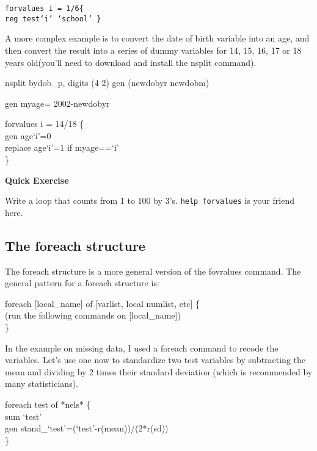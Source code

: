 \documentclass[10pt]{article}
\begin{document}
\texttt{forvalues i = 1/6\{\\
         reg test`i' `school'
        \} 
        }

A more complex example is to convert the date of birth variable into
an age, and then convert the result into a series of dummy variables for  14, 15, 16, 17 or 18
years old(you'll need to download and install the nsplit command).

\begin{texttt}
nsplit bydob\_p, digits (4 2) gen (newdobyr newdobm)

gen myage= 2002-newdobyr

forvalues i = 14/18 \{\\
gen age`i'=0\\
replace age`i'=1 if myage==`i'\\
\} \\

\end{texttt}
\textbf{Quick Exercise}

Write a loop that counts from 1 to 100 by 3's. \texttt{help forvalues}
is your friend here. 


\subsection{The foreach structure}

The foreach structure is a more general version of the fovralues
command. The general pattern for a foreach structure is: 

\begin{texttt}
  foreach [local\_name] of [varlist, local numlist, etc] \{\\
    (run the following commands on [local\_name]) \\
    \}
\end{texttt}

In the example on missing data, I used a foreach command to recode the
variables. Let's use one now to standardize two test variables by
subtracting the mean and dividing by 2 times their standard deviation
(which is recommended by many statisticians).

\begin{texttt}
  foreach test of *nels* \{ \\
 sum `test' \\
 gen stand\_`test'=(`test'-r(mean))/(2*r(sd)) \\
\} \\
\end{texttt}
\end{document}
